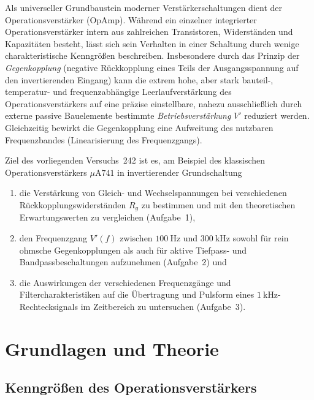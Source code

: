 \documentclass[12pt,a4paper,titlepage]{scrartcl}
\numberwithin{equation}{section}
\numberwithin{table}{section}
\numberwithin{figure}{section}
\begin{document}
Als universeller Grundbaustein moderner Verstärkerschaltungen dient der Operationsverstärker (OpAmp). Während ein einzelner integrierter Operationsverstärker intern aus zahlreichen Transistoren, Widerständen und Kapazitäten besteht, lässt sich sein Verhalten in einer Schaltung durch wenige charakteristische Kenngrößen beschreiben. Insbesondere durch das Prinzip der \emph{Gegenkopplung} (negative Rückkopplung eines Teils der Ausgangsspannung auf den invertierenden Eingang) kann die extrem hohe, aber stark bauteil-, temperatur- und frequenzabhängige Leerlaufverstärkung des Operationsverstärkers auf eine präzise einstellbare, nahezu ausschließlich durch externe passive Bauelemente bestimmte \emph{Betriebsverstärkung} $V'$ reduziert werden. Gleichzeitig bewirkt die Gegenkopplung eine Aufweitung des nutzbaren Frequenzbandes (Linearisierung des Frequenzgangs).

Ziel des vorliegenden Versuchs~242 ist es, am Beispiel des klassischen Operationsverstärkers $\mu\text{A}741$ in invertierender Grundschaltung
\begin{enumerate}
    \item die Verstärkung von Gleich- und Wechselspannungen bei verschiedenen Rückkopplungswiderständen $R_g$ zu bestimmen und mit den theoretischen Erwartungswerten zu vergleichen (Aufgabe~1),
    \item den Frequenzgang $V'(f)$ zwischen $\SI{100}{\hertz}$ und $\SI{300}{\kilo\hertz}$ sowohl für rein ohmsche Gegenkopplungen als auch für aktive Tiefpass- und Bandpassbeschaltungen aufzunehmen (Aufgabe~2) und
    \item die Auswirkungen der verschiedenen Frequenzgänge und Filtercharakteristiken auf die Übertragung und Pulsform eines $\SI{1}{\kilo\hertz}$-Rechtecksignals im Zeitbereich zu untersuchen (Aufgabe~3).
\end{enumerate}

\section{Grundlagen und Theorie}\label{sec:Grundlagen}

\subsection{Kenngrößen des Operationsverstärkers}
\end{document}
